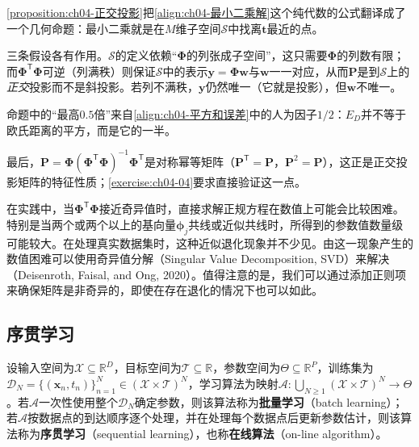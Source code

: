 \documentclass[../../main.tex]{subfiles}
\begin{document}
\begin{remark}
\cref{proposition:ch04-正交投影}把\eqref{align:ch04-最小二乘解}这个纯代数的公式翻译成了一个几何命题：最小二乘就是在$M$维子空间$\mathcal{S}$中找离$\boldsymbol{t}$最近的点。

三条假设各有作用。$\mathcal{S}$的定义依赖“$\boldsymbol{\Phi}$的列张成子空间”，这只需要$\boldsymbol{\Phi}$的列数有限；而$\boldsymbol{\Phi}^{\mathsf{T}}\boldsymbol{\Phi}$可逆（列满秩）则保证$\mathcal{S}$中的表示$\boldsymbol{y}=\boldsymbol{\Phi}\boldsymbol{w}$与$\boldsymbol{w}$一一对应，从而$\boldsymbol{P}$是到$\mathcal{S}$上的\emph{正交}投影而不是斜投影。若列不满秩，$\boldsymbol{y}$仍然唯一（它就是投影），但$\boldsymbol{w}$不唯一。

命题中的“最高$0.5$倍”来自\eqref{align:ch04-平方和误差}中的人为因子$1/2$：$E_D$并不等于欧氏距离的平方，而是它的一半。

最后，$\boldsymbol{P}=\boldsymbol{\Phi}(\boldsymbol{\Phi}^{\mathsf{T}}\boldsymbol{\Phi})^{-1}\boldsymbol{\Phi}^{\mathsf{T}}$是对称幂等矩阵（$\boldsymbol{P}^{\mathsf{T}}=\boldsymbol{P}$，$\boldsymbol{P}^2=\boldsymbol{P}$），这正是正交投影矩阵的特征性质；\cref{exercise:ch04-04}要求直接验证这一点。
\end{remark}

在实践中，当$\boldsymbol{\Phi}^{\mathsf{T}}\boldsymbol{\Phi}$接近奇异值时，直接求解正规方程在数值上可能会比较困难。特别是当两个或两个以上的基向量$\boldsymbol{\phi}_j$共线或近似共线时，所得到的参数值数量级可能较大。在处理真实数据集时，这种近似退化现象并不少见。由这一现象产生的数值困难可以使用奇异值分解（Singular Value Decomposition, SVD）来解决（Deisenroth, Faisal, and Ong, 2020）。值得注意的是，我们可以通过添加正则项来确保矩阵是非奇异的，即使在存在退化的情况下也可以如此。

\subsection{序贯学习}\label{subsection:ch04-序贯学习}

\begin{definition}[批量学习与序贯学习]\label{definition:ch04-批量与序贯学习}
设输入空间为$\mathcal{X}\subseteq\mathbb{R}^{D}$，目标空间为$\mathcal{T}\subseteq\mathbb{R}$，参数空间为$\Theta\subseteq\mathbb{R}^{P}$，训练集为$\mathcal{D}_N=\{(\boldsymbol{x}_n,t_n)\}_{n=1}^{N}\in(\mathcal{X}\times\mathcal{T})^{N}$，学习算法为映射$\mathcal{A}:\bigcup_{N\geqslant1}(\mathcal{X}\times\mathcal{T})^{N}\to\Theta$。若$\mathcal{A}$一次性使用整个$\mathcal{D}_N$确定参数，则该算法称为\textbf{批量学习}（batch learning）；若$\mathcal{A}$按数据点的到达顺序逐个处理，并在处理每个数据点后更新参数估计，则该算法称为\textbf{序贯学习}（sequential learning），也称\textbf{在线算法}（on-line algorithm）。
\end{definition}
\end{document}
